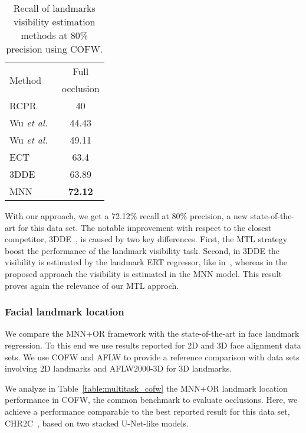 \documentclass[9pt,technote,compsoc]{IEEEtran}
\newcommand{\etal}{\emph{et al.}}
\begin{document}
\begin{table}[htbp!]
\begin{center}
\begin{tabular}{l|c}
\hline
\multirow{2}{*}{Method} & Full\\
 & occlusion\\
\hline
RCPR~\cite{Burgos13} & 40\\
Wu \etal~\cite{Wu17} & 44.43\\
Wu \etal~\cite{Wu15} & 49.11\\
ECT~\cite{Zhang18a} & 63.4\\
3DDE~\cite{Valle19b} & 63.89\\
\hline
MNN & \textbf{72.12}\\
\hline
\end{tabular}
\end{center}
\caption{Recall of landmarks visibility estimation methods at 80\% precision using COFW.}
\label{table:visibility_cofw}
\end{table} 

With our approach, we get a 72.12\% recall at 80\% precision, a new state-of-the-art for this data set. 
The notable improvement with respect to the closest competitor, 3DDE~\cite{Valle19b}, is caused by two key differences. First, the MTL strategy boost the performance of the landmark visibility task. Second, in 3DDE the visibility is estimated by the landmark ERT regressor, like in~\cite{Burgos13,Valle18}, whereas in the proposed approach the visibility is estimated in the MNN model.
This result proves again the relevance of our MTL approch. 



\subsubsection{Facial landmark location}

We compare the MNN+OR framework with the state-of-the-art in face landmark regression. To this end we use results reported for 2D and 3D face alignment data sets. We use COFW and AFLW to provide a reference comparison with data sets  involving 2D landmarks and AFLW2000-3D for 3D landmarks.

We analyze in Table~\ref{table:multitask_cofw} the MNN+OR landmark location performance in COFW, the common benchmark to evaluate occlusions. Here, we achieve a performance comparable to the best reported result for this data set, CHR2C~\cite{Valle19a}, based on two stacked U-Net-like models.
\end{document}
